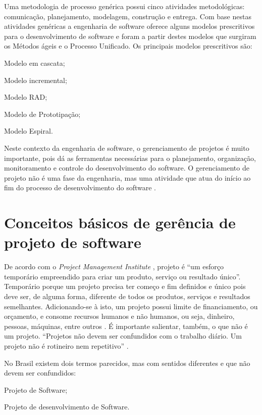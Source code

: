 \documentclass[
    12pt,               %
    openright,          %
    twoside,            %
    a4paper,            %
    chapter=TITLE,     %
    english,            %
    spanish,            %
    portuguese              %
    ]{abntex2}
\newcommand\dblquote[1]{\textquotedblleft #1\textquotedblright}
\begin{document}
Uma metodologia de processo genérica possui cinco atividades metodológicas: comunicação, planejamento, modelagem, construção e entrega. Com base nestas atividades genéricas a engenharia de software oferece alguns modelos prescritivos para o desenvolvimento de software e foram a partir destes modelos que surgiram os Métodos ágeis e o Processo Unificado. Os principais modelos prescritivos são: 

\begin{alineas}
	\item Modelo em cascata;
	\item Modelo incremental;
	\item Modelo RAD;
	\item Modelo de Prototipação;
	\item Modelo Espiral.
\end{alineas}

Neste contexto da engenharia de software, o gerenciamento de projetos é muito importante, pois dá as ferramentas necessárias para o planejamento, organização, monitoramento e controle do desenvolvimento do software. O gerenciamento de projeto não é uma fase da engenharia, mas uma atividade que atua do início ao fim do processo de desenvolvimento do software \cite{pressman2011}.

\section{Conceitos básicos de gerência de projeto de software}
De acordo com o \textit{Project Management Institute} \cite{pmi2013}, projeto é \dblquote{um esforço temporário empreendido para criar um produto, serviço ou resultado único}. Temporário porque um projeto precisa ter começo e fim definidos e único pois deve ser, de alguma forma, diferente de todos os produtos, serviços e resultados semelhantes. Adicionando-se à isto, um projeto possui limite de financiamento, ou orçamento, e consome recursos humanos e não humanos, ou seja, dinheiro, pessoas, máquinas, entre outros \cite[p.~2]{kerzner2011}. É importante salientar, também, o que não é um projeto. \dblquote{Projetos não devem ser confundidos com o trabalho diário. Um projeto não é rotineiro nem repetitivo} \cite[p.~6]{grayLarson2009}.

No Brasil existem dois termos parecidos, mas com sentidos diferentes e que não devem ser confundidos:

\begin{alineas}
	\item Projeto de Software;
	\item Projeto de desenvolvimento de Software.
\end{alineas}
\end{document}
